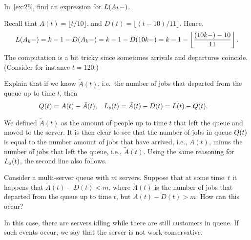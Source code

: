 \begin{exercise}\label{ex:97}
In~\cref{ex:25},  find an expression for $L(A_k-)$.
\begin{solution}
Recall that $A(t) = \lfloor t/10\rfloor$, and $D(t) = \lfloor (t-10)/11 \rfloor$.
  Hence,
 \begin{equation*}
 L(A_k-) = k-1 - D(A_k-) = k- 1 - D(10k-) = k- 1 - \left \lfloor \frac{(10k-)-10}{11} \right \rfloor.
 \end{equation*}
 The computation is a bit tricky since sometimes arrivals and departures coincide. (Consider for instance $t=120$.)

\end{solution}
\end{exercise}


\begin{exercise}
  Explain  that if we know $\tilde A(t)$, i.e.\ the number of jobs that departed from the queue up to time $t$, then
\begin{align*}
 Q(t) &= A(t) - \tilde A(t), & L_s(t) &= \tilde A(t) - D(t) = L(t) - Q(t).
\end{align*}
\begin{solution}
  We defined $\tilde A(t)$ as the amount of people up to time $t$ that left the queue and moved to the server.
  It is then clear to see that the number of jobs in queue $Q(t)$ is equal to the number amount of jobs that have arrived, i.e., $A(t)$, minus the number of jobs that left the queue, i.e., $\tilde A(t)$.
  Using the same reasoning for $L_s(t)$,  the second line also follows.
\end{solution}
\end{exercise}

\begin{exercise}
  Consider
  a multi-server queue with $m$ servers.
  Suppose that at some time~$t$ it happens that $\tilde A(t) - D(t) < m$, where $\tilde A(t)$ is the number of jobs that departed from the queue up to time $t$, but $A(t) - D(t) > m$.
  How can this occur?
\begin{solution}
  In this case, there are servers idling while there are still customers in queue.
  If such events occur, we say that the server is not work-conservative.
\end{solution}
\end{exercise}



